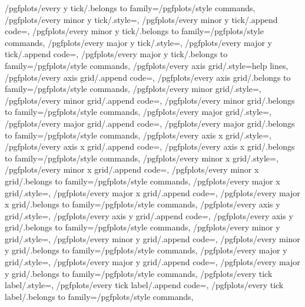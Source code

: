 {	/pgfplots/every y tick/.belongs to family=/pgfplots/style commands,
	/pgfplots/every minor y tick/.style={},
	/pgfplots/every minor y tick/.append code={},
	/pgfplots/every minor y tick/.belongs to family=/pgfplots/style commands,
	/pgfplots/every major y tick/.style={},
	/pgfplots/every major y tick/.append code={},
	/pgfplots/every major y tick/.belongs to family=/pgfplots/style commands,
	/pgfplots/every axis grid/.style={help lines},
	/pgfplots/every axis grid/.append code={},
	/pgfplots/every axis grid/.belongs to family=/pgfplots/style commands,
	/pgfplots/every minor grid/.style={},
	/pgfplots/every minor grid/.append code={},
	/pgfplots/every minor grid/.belongs to family=/pgfplots/style commands,
	/pgfplots/every major grid/.style={},
	/pgfplots/every major grid/.append code={},
	/pgfplots/every major grid/.belongs to family=/pgfplots/style commands,
	/pgfplots/every axis x grid/.style={},
	/pgfplots/every axis x grid/.append code={},
	/pgfplots/every axis x grid/.belongs to family=/pgfplots/style commands,
	/pgfplots/every minor x grid/.style={},
	/pgfplots/every minor x grid/.append code={},
	/pgfplots/every minor x grid/.belongs to family=/pgfplots/style commands,
	/pgfplots/every major x grid/.style={},
	/pgfplots/every major x grid/.append code={},
	/pgfplots/every major x grid/.belongs to family=/pgfplots/style commands,
	/pgfplots/every axis y grid/.style={},
	/pgfplots/every axis y grid/.append code={},
	/pgfplots/every axis y grid/.belongs to family=/pgfplots/style commands,
	/pgfplots/every minor y grid/.style={},
	/pgfplots/every minor y grid/.append code={},
	/pgfplots/every minor y grid/.belongs to family=/pgfplots/style commands,
	/pgfplots/every major y grid/.style={},
	/pgfplots/every major y grid/.append code={},
	/pgfplots/every major y grid/.belongs to family=/pgfplots/style commands,
	/pgfplots/every tick label/.style={},
	/pgfplots/every tick label/.append code={},
	/pgfplots/every tick label/.belongs to family=/pgfplots/style commands,
}
